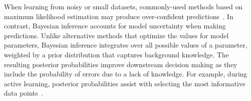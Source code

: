 When learning from noisy or small datasets, commonly-used
methods based on maximum likelihood estimation may produce over-confident predictions~\cite{xiong2011bayesian,srivastava2014dropout}. 
In contrast, Bayesian inference accounts for model uncertainty when making predictions.
Unlike alternative methods that optimize the values for model parameters, Bayesian inference
integrates over all possible values of a parameter, weighted by a prior distribution that captures background knowledge.
The resulting posterior probabilities improve downstream decision making
as they include the probability of errors due to a lack of knowledge. For example, 
during active learning, posterior probabilities assist with selecting the most informative data points~\cite{settles2010active}.

